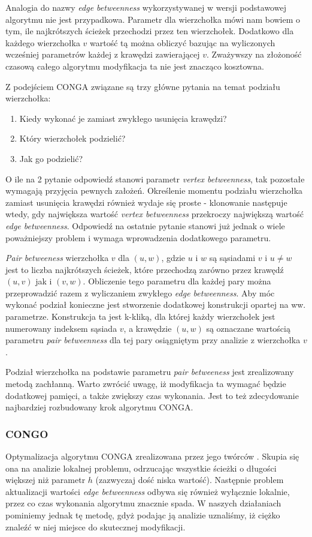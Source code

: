 \documentclass{article}
\begin{document}
Analogia do nazwy \textit{edge betweenness} wykorzystywanej w wersji podstawowej algorytmu nie jest przypadkowa. Parametr dla wierzchołka mówi nam bowiem o tym, ile najkrótszych ścieżek przechodzi przez ten wierzchołek. Dodatkowo dla każdego wierzchołka ${v}$ wartość tą można obliczyć bazując na wyliczonych wcześniej parametrów każdej z krawędzi zawierającej ${v}$. Zważywszy na złożoność czasową całego algorytmu modyfikacja ta nie jest znacząco kosztowna.

Z podejściem CONGA związane są trzy główne pytania na temat podziału wierzchołka:
\begin{enumerate}
\item Kiedy wykonać je zamiast zwykłego usunięcia krawędzi?
\item Który wierzchołek podzielić?
\item Jak go podzielić?
\end{enumerate} 

O ile na 2 pytanie odpowiedź stanowi parametr \textit{vertex betweenness}, tak pozostałe wymagają przyjęcia pewnych założeń. Określenie momentu podziału wierzchołka zamiast usunięcia krawędzi również wydaje się proste - klonowanie następuje wtedy, gdy największa wartość \textit{vertex betweenness} przekroczy największą wartość \textit{edge betweenness}. Odpowiedź na ostatnie pytanie stanowi już jednak o wiele poważniejszy problem i wymaga wprowadzenia dodatkowego parametru.

\textit{Pair betweeness} wierzchołka $v$ dla $(u,w)$, gdzie $u$ i $w$ są sąsiadami $v$ i $u \neq w$ jest to liczba najkrótszych ścieżek, które przechodzą zarówno przez krawędź $(u,v)$ jak i $(v,w)$. Obliczenie tego parametru dla każdej pary można przeprowadzić razem z wyliczaniem zwykłego \textit{edge betweenness}. Aby móc wykonać podział konieczne jest stworzenie dodatkowej konstrukcji opartej na ww. parametrze. Konstrukcja ta jest k-kliką, dla której każdy wierzchołek jest numerowany indeksem sąsiada $v$, a krawędzie $(u,w)$ są oznaczane wartością parametru \textit{pair betweenness} dla tej pary osiągniętym przy analizie z wierzchołka $v$.

Podział wierzchołka na podstawie parametru \textit{pair betweeness} jest zrealizowany metodą zachłanną. Warto zwrócić uwagę, iż modyfikacja ta wymagać będzie dodatkowej pamięci, a także zwiększy czas wykonania. Jest to też zdecydowanie najbardziej rozbudowany krok algorytmu CONGA.
\subsubsection{CONGO}
Optymalizacja algorytmu CONGA zrealizowana przez jego twórców \cite{is-paper3}. Skupia się ona na analizie lokalnej problemu, odrzucając wszystkie ścieżki o długości większej niż parametr $h$ (zazwyczaj dość niska wartość). Następnie problem aktualizacji wartości \textit{edge betweenness} odbywa się również wyłącznie lokalnie, przez co czas wykonania algorytmu znacznie spada. W naszych działaniach pominiemy jednak tę metodę, gdyż podając ją analizie uznaliśmy, iż ciężko znaleźć w niej miejsce do skutecznej modyfikacji.
\end{document}
